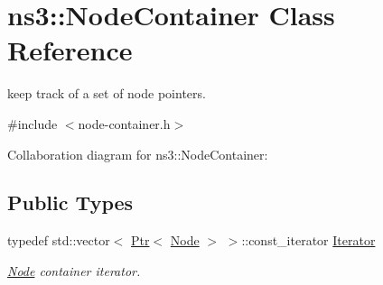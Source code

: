 \hypertarget{classns3_1_1NodeContainer}{}\section{ns3\+:\+:Node\+Container Class Reference}
\label{classns3_1_1NodeContainer}


keep track of a set of node pointers.  




{\ttfamily \#include $<$node-\/container.\+h$>$}



Collaboration diagram for ns3\+:\+:Node\+Container\+:
\subsection*{Public Types}
\begin{DoxyCompactItemize}
\item 
typedef std\+::vector$<$ \hyperlink{classns3_1_1Ptr}{Ptr}$<$ \hyperlink{classns3_1_1Node}{Node} $>$ $>$\+::const\+\_\+iterator \hyperlink{classns3_1_1NodeContainer_aa1a9f2d2b09bfef7d066d3974bca2cc4}{Iterator}
\begin{DoxyCompactList}\small\item\em \hyperlink{classns3_1_1Node}{Node} container iterator. \end{DoxyCompactList}\end{DoxyCompactItemize}
